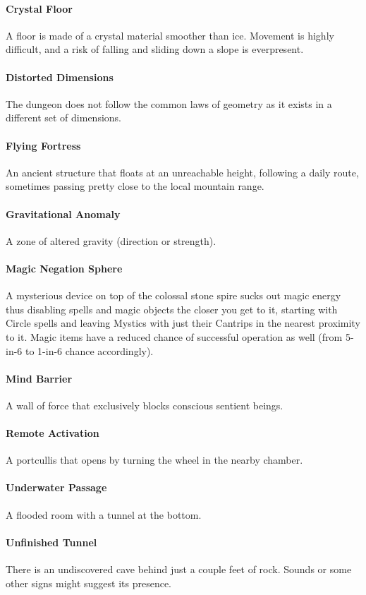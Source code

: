 \documentclass[itdr]{subfiles}
\begin{document}
\paragraph{Crystal Floor}
A floor is made of a crystal material smoother than ice. Movement is highly difficult, and a risk of falling and sliding down a slope is everpresent.

\paragraph{Distorted Dimensions}
The dungeon does not follow the common laws of geometry as it exists in a different set of dimensions.

\paragraph{Flying Fortress}
An ancient structure that floats at an unreachable height, following a daily route, sometimes passing pretty close to the local mountain range.

\paragraph{Gravitational Anomaly}
A zone of altered gravity (direction or strength).

\paragraph{Magic Negation Sphere}
A mysterious device on top of the colossal stone spire sucks out magic energy thus disabling spells and magic objects the closer you get to it, starting with  Circle spells and leaving Mystics with just their Cantrips in the nearest proximity to it. Magic items have a reduced chance of successful operation as well (from 5-in-6 to 1-in-6 chance accordingly).

\paragraph{Mind Barrier}
A wall of force that exclusively blocks conscious sentient beings.

\paragraph{Remote Activation}
A portcullis that opens by turning the wheel in the nearby chamber.

\paragraph{Underwater Passage}
A flooded room with a tunnel at the bottom.

\paragraph{Unfinished Tunnel}
There is an undiscovered cave behind just a couple feet of rock. Sounds or some other signs might suggest its presence.
\end{document}
